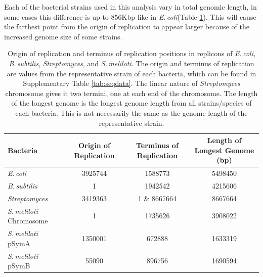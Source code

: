 \documentclass[11pt]{article}
\newcommand{\smel}{\textit{S.\,meliloti}\xspace}
\newcommand{\strep}{\textit{Streptomyces}\xspace}
\newcommand{\ecol}{\textit{E.\,coli}\xspace}
\newcommand{\bass}{\textit{B.\,subtilis}\xspace}
\begin{document}
Each of the bacterial strains used in this analysis vary in total genomic length, in some cases this difference is up to 856Kbp like in \ecol (Table \ref{tab:oriloc}). 
This will cause the farthest point from the origin of replication to appear larger because of the increased genome size of some strains.


	\begin{table}[H]
		\begin{center}
			\begin{tabular}{lccc}
				\toprule
				Bacteria & Origin of Replication & Terminus of Replication & Length of Longest Genome (bp)\\
				\midrule
				\ecol & 3925744 & 1588773 & 5498450 \\
				\bass & 1 & 1942542 & 4215606\\
				\strep & 3419363 & 1 \& 8667664 & 8667664\\
				\smel Chromosome & 1 & 1735626 & 3908022\\
				\smel pSymA & 1350001 & 672888 & 1633319\\
				\smel pSymB & 55090 & 896756 & 1690594\\
				\bottomrule
			\end{tabular}
			\caption{\label{tab:oriloc} Origin of replication and terminus of replication positions in replicons of \ecol, \bass, \strep, and \smel. The origin and terminus of replication are values from the representative strain of each bacteria, which can be found in Supplementary Table \ref{tab:seqdata}. The linear nature of \strep chromosome gives it two termini, one at each end of the chromosome. The length of the longest genome is the longest genome length from all strains/species of each bacteria. This is not necessarily the same as the genome length of the representative strain.}
		\end{center}
	\end{table}
\end{document}

